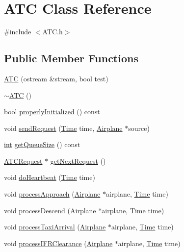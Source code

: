 \hypertarget{classATC}{}\section{A\+TC Class Reference}
\label{classATC}


{\ttfamily \#include $<$A\+T\+C.\+h$>$}

\subsection*{Public Member Functions}
\begin{DoxyCompactItemize}
\item 
\hyperlink{classATC_a0de2d89620bec8a6dd2d7e9c2d7cb011}{A\+TC} (ostream \&stream, bool test)
\item 
\hyperlink{classATC_a38f7e89c6714ec322ab0796020047f7e}{$\sim$\+A\+TC} ()
\item 
bool \hyperlink{classATC_a6b6a10a87c06028bd96d6e5efff170b7}{properly\+Initialized} () const 
\item 
void \hyperlink{classATC_aaabbddfb988289b786b18ba8f50510f2}{send\+Request} (\hyperlink{classTime}{Time} time, \hyperlink{classAirplane}{Airplane} $\ast$source)
\item 
\hyperlink{CMakeCache_8txt_a79a3d8790b2588b09777910863574e09}{int} \hyperlink{classATC_a5ed72477deceb2ae06dbfc01fe308b9b}{get\+Queue\+Size} () const 
\item 
\hyperlink{structATCRequest}{A\+T\+C\+Request} $\ast$ \hyperlink{classATC_a2882681c8a007c3acb80d027807d8f50}{get\+Next\+Request} ()
\item 
void \hyperlink{classATC_af85d95048677c52f411d25c910e999ef}{do\+Heartbeat} (\hyperlink{classTime}{Time} time)
\item 
void \hyperlink{classATC_a4adc92a57a78b6e201164d17c88886cf}{process\+Approach} (\hyperlink{classAirplane}{Airplane} $\ast$airplane, \hyperlink{classTime}{Time} time)
\item 
void \hyperlink{classATC_ad9fa691584f1f5d78aa9debf9fe2f4c8}{process\+Descend} (\hyperlink{classAirplane}{Airplane} $\ast$airplane, \hyperlink{classTime}{Time} time)
\item 
void \hyperlink{classATC_ab8957280df7e56cbd9e7cefb4d4d6997}{process\+Taxi\+Arrival} (\hyperlink{classAirplane}{Airplane} $\ast$airplane, \hyperlink{classTime}{Time} time)
\item 
void \hyperlink{classATC_ac81f1cbc3ce6a9e85420059a19d99dc5}{process\+I\+F\+R\+Clearance} (\hyperlink{classAirplane}{Airplane} $\ast$airplane, \hyperlink{classTime}{Time} time)

\end{DoxyCompactItemize}
